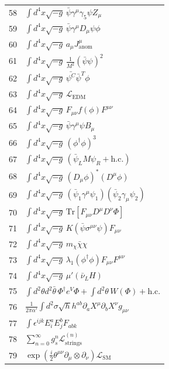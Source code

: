 \documentclass[12pt,a4paper]{article}
\begin{document}
\begin{longtable}{r p{}}
	58 & \(\displaystyle \int d^4x\sqrt{-g}\,\bar\psi\gamma^\mu\gamma_5\psi Z_\mu\) \\
	59 & \(\displaystyle \int d^4x\sqrt{-g}\,\bar\psi\gamma^\mu D_\mu\psi\phi\) \\
	60 & \(\displaystyle \int d^4x\sqrt{-g}\,a_\mu J^\mu_{\text{anom}}\) \\
	61 & \(\displaystyle \int d^4x\sqrt{-g}\,\frac{1}{M^2}(\bar\psi\psi)^2\) \\
	62 & \(\displaystyle \int d^4x\sqrt{-g}\,\bar{\psi^C}\bar{\psi}^T\phi\) \\
	63 & \(\displaystyle \int d^4x\sqrt{-g}\,\mathcal{L}_{\text{EDM}}\) \\
	64 & \(\displaystyle \int d^4x\sqrt{-g}\,F_{\mu\nu}f(\phi)F^{\mu\nu}\) \\
	65 & \(\displaystyle \int d^4x\sqrt{-g}\,\bar\psi\gamma^\mu\psi B_\mu\) \\
	66 & \(\displaystyle \int d^4x\sqrt{-g}\,(\phi^\dagger\phi)^3\) \\
	67 & \(\displaystyle \int d^4x\sqrt{-g}\,(\bar\psi_L M \psi_R + \text{h.c.})\) \\
	68 & \(\displaystyle \int d^4x\sqrt{-g}\,(D_\mu\phi)^*(D^\mu\phi)\) \\
	69 & \(\displaystyle \int d^4x\sqrt{-g}\,(\bar\psi_1\gamma^\mu\psi_1)(\bar\psi_2\gamma_\mu\psi_2)\) \\
	70 & \(\displaystyle \int d^4x\sqrt{-g}\,\mathrm{Tr}[F_{\mu\nu}D^\mu D^\nu\Phi]\) \\
	71 & \(\displaystyle \int d^4x\sqrt{-g}\,K(\bar\psi\sigma^{\mu\nu}\psi)F_{\mu\nu}\) \\
	72 & \(\displaystyle \int d^4x\sqrt{-g}\,m_\chi\bar\chi\chi\) \\
	73 & \(\displaystyle \int d^4x\sqrt{-g}\,\lambda_1(\phi^\dagger\phi)F_{\mu\nu}F^{\mu\nu}\) \\
	74 & \(\displaystyle \int d^4x\sqrt{-g}\,\mu'(\bar\nu_L H)\) \\
	75 & \(\displaystyle \int d^2\theta d^2\bar\theta\,\Phi^\dagger e^V\Phi + \int d^2\theta\,W(\Phi) + \text{h.c.}\) \\
	76 & \(\displaystyle \frac{1}{2\pi\alpha'}\int d^2\sigma\sqrt{h}h^{ab}\partial_a X^\mu\partial_b X^\nu g_{\mu\nu}\) \\
	77 & \(\displaystyle \int \epsilon^{ijk}E_i^a E_j^b F_{ab k}\) \\
	78 & \(\displaystyle \sum_{n=0}^\infty g_s^n \mathcal{L}^{(n)}_{\text{strings}}\) \\
	79 & \(\displaystyle \exp\left(\frac{i}{2}\theta^{\mu\nu}\partial_\mu\otimes\partial_\nu\right)\mathcal{L}_{\text{SM}}\) \\

\end{longtable}
\end{document}
